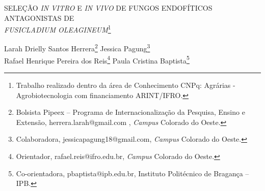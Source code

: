 \documentclass[article,12pt,onesidea,4paper,english,brazil]{abntex2}
\begin{document}
	
	
	\frenchspacing 
	
	\begin{center}
		\LARGE SELEÇÃO \textit{IN VITRO} E \textit{IN VIVO} DE FUNGOS ENDOFÍTICOS ANTAGONISTAS DE \\\textit{FUSICLADIUM OLEAGINEUM}\footnote{Trabalho realizado dentro da área de Conhecimento CNPq: Agrárias - Agrobiotecnologia com financiamento ARINT/IFRO.}
		
		\normalsize
		Larah Drielly Santos Herrera\footnote{Bolsista Pipeex – Programa de Internacionalização da Pesquisa, Ensino e Extensão, herrera.larah@gmail.com , \textit{Campus} Colorado do Oeste.} 
		Jessica Pagung\footnote{Colaboradora, jessicapagung18@gmail.com, \textit{Campus} Colorado do Oeste.} \\
		Rafael Henrique Pereira dos Reis\footnote{Orientador, rafael.reis@ifro.edu.br, \textit{Campus} Colorado do Oeste.} 
		Paula Cristina Baptista\footnote{Co-orientadora, pbaptista@ipb.edu.br, Instituto Politécnico de Bragança – IPB.} 
	\end{center}
	
\end{document}
